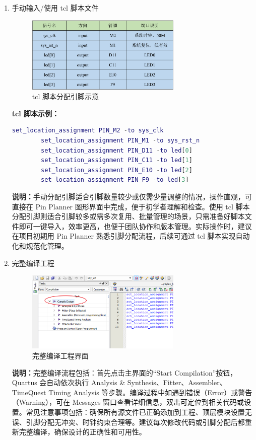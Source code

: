 \documentclass[UTF8]{article}
\theoremstyle{MyLineTheoremStyle} %
\theoremstyle{MyBlockTheoremStyle} %
\theoremstyle{MySubsubsectionStyle} %
\begin{document}
\begin{enumerate}
    \item 手动输入/使用 tcl 脚本文件
    \begin{figure}[H]
        \centering
        \includegraphics[width=0.7\textwidth]{step7.png}
        \caption{tcl 脚本分配引脚示意}
        \label{fig:step7}
    \end{figure}
    \textbf{tcl 脚本示例：}
    \begin{lstlisting}[language=Matlab, style=MatlabStyle_src]
        set_location_assignment PIN_M2 -to sys_clk
        set_location_assignment PIN_M1 -to sys_rst_n
        set_location_assignment PIN_D11 -to led[0]
        set_location_assignment PIN_C11 -to led[1]
        set_location_assignment PIN_E10 -to led[2]
        set_location_assignment PIN_F9 -to led[3]
    \end{lstlisting}
    \textbf{说明：}手动分配引脚适合引脚数量较少或仅需少量调整的情况，操作直观，可直接在 Pin Planner 图形界面中完成，便于初学者理解和检查。使用 tcl 脚本分配引脚则适合引脚较多或需多次复用、批量管理的场景，只需准备好脚本文件即可一键导入，效率更高，也便于团队协作和版本管理。实际操作时，建议在项目初期用 Pin Planner 熟悉引脚分配流程，后续可通过 tcl 脚本实现自动化和规范化管理。
  
\cleardoublepage    
    
    \item 完整编译工程
    \begin{figure}[H]
        \centering
        \includegraphics[width=0.7\textwidth]{step8.png}
        \caption{完整编译工程界面}
        \label{fig:step8}
    \end{figure}
    \textbf{说明：}完整编译流程包括：首先点击主界面的“Start Compilation”按钮，Quartus 会自动依次执行 Analysis \& Synthesis、Fitter、Assembler、TimeQuest Timing Analysis 等步骤。编译过程中如遇到错误（Error）或警告（Warning），可在 Messages 窗口查看详细信息，双击可定位到相关代码或设置。常见注意事项包括：确保所有源文件已正确添加到工程、顶层模块设置无误、引脚分配无冲突、时钟约束合理等。建议每次修改代码或引脚分配后都重新完整编译，确保设计的正确性和可用性。
\cleardoublepage


\end{enumerate}
\end{document}

